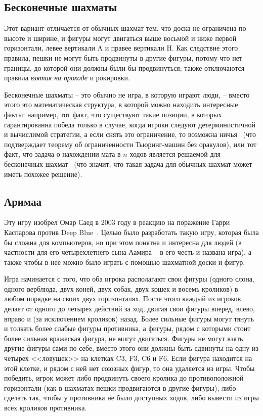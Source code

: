 \documentclass{article}
\begin{document}
\subsection{Бесконечные шахматы}

Этот вариант отличается от обычных шахмат тем, 
что доска не ограничена по высоте и ширине,
и фигуры могут двигаться выше восьмой и ниже первой горизонтали,
левее вертикали A и правее вертикали H.
Как следствие этого правила, пешки не могут быть продвинуты в другие фигуры, потому что нет границы, до которой они должны были бы продвинуться;
также отключаются правила \emph{взятия на проходе} и рокировки.

Бесконечные шахматы -- это обычно не игра, в которую играют люди, --
вместо этого это математическая структура, в которой можно находить интересные факты:
например, тот факт, что существуют такие позиции,
в которых гарантированна победа только в случае, когда игроки следуют
детерминистичной и вычислимой стратегии, а если снять это ограничение, то возможна ничья~\cite{transfinite-game-values} 
(что подтверждает теорему об ограниченности Тьюринг-машин без оракулов),
или тот факт, что задача о нахождении мата в $n$ ходов 
является решаемой для бесконечных шахмат~\cite{infinite-mate-in-n}
(что значит, что такая задача для обычных шахмат может иметь похожее решение).

\subsection{Аримаа}

Эту игру изобрел Омар Саед в 2003 году в реакцию на поражение Гарри Каспарова против Deep Blue~\cite{arimaa}.
Целью было разработать такую игру, которая была бы сложна для компьютеров,
но при этом понятна и интересна для людей (в частности для его четырехлетнего сына Аамира -- в его честь и названа игра),
а также чтобы в нее можно было играть с помощью шахматной доски и фигур.

Игра начинается с того, что оба игрока располагают свои фигуры (одного слона, одного верблюда, двух коней, двух собак, двух кошек и восемь кроликов)
в любом порядке на своих двух горизонталях.
После этого каждый из игроков делает от одного до четырех действий за ход,
двигая свои фигуры вперед, влево, вправо и (за исключением кроликов) назад.
Более сильные фигуры могут тянуть и толкать более слабые фигуры противника,
а фигуры, рядом с которыми стоит более сильная вражеская фигура, не могут двигаться.
Фигуры не могут взять другие фигуры сами по себе,
вместо этого они должны быть сдвинуты на одну из четырех <<ловушек>> на клетках C3, F3, C6 и F6.
Если фигура находится на этой клетке, и рядом с ней нет союзных фигур,
то она удаляется из игры.
Чтобы победить, игрок может либо продвинуть своего кролика до противоположной горизонтали
(как в шахматах пешки продвигаются в другие фигуры),
либо сделать так, чтобы у противника не было доступных ходов,
либо вывести из игры всех кроликов противника.
\end{document}

